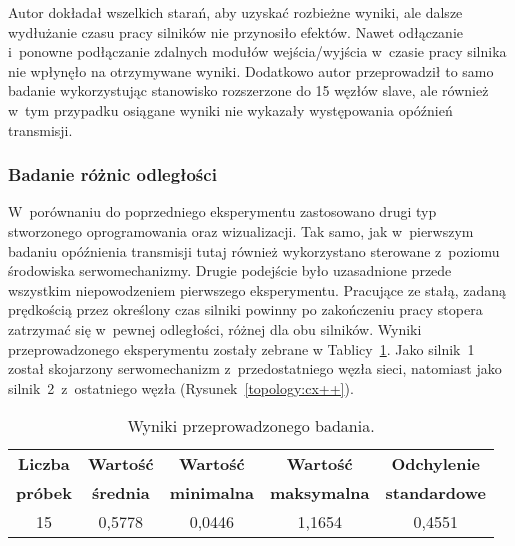 Autor dokładał wszelkich starań, aby uzyskać rozbieżne wyniki, ale dalsze wydłużanie czasu pracy silników nie przynosiło efektów. Nawet odłączanie i~ponowne podłączanie zdalnych modułów wejścia/wyjścia w~czasie pracy silnika nie wpłynęło na otrzymywane wyniki. Dodatkowo autor przeprowadził to samo badanie wykorzystując stanowisko rozszerzone do 15 węzłów slave, ale również w~tym przypadku osiągane wyniki nie wykazały występowania opóźnień transmisji.
\clearpage
\subsubsection{Badanie różnic odległości}
W~porównaniu do poprzedniego eksperymentu zastosowano drugi typ stworzonego oprogramowania oraz wizualizacji. Tak samo, jak w~pierwszym badaniu opóźnienia transmisji tutaj również wykorzystano sterowane z~poziomu środowiska serwomechanizmy. Drugie podejście było uzasadnione przede wszystkim niepowodzeniem pierwszego eksperymentu. Pracujące ze stałą, zadaną prędkością przez określony czas silniki powinny po zakończeniu pracy stopera zatrzymać się w~pewnej odległości, różnej dla obu silników. Wyniki przeprowadzonego eksperymentu zostały zebrane w Tablicy~\ref{badania:wyniki:servo_dist}. Jako silnik~1 został skojarzony serwomechanizm z~przedostatniego węzła sieci, natomiast jako silnik~2~z~ostatniego węzła (Rysunek~\ref{topology:cx++}).

\begin{table}[!htb]
\begin{center}
\begin{tabular}{| c | c | c | c | c |}\hline
\textbf{Liczba} & \textbf{Wartość} & \textbf{Wartość} & \textbf{Wartość} & \textbf{Odchylenie} \\
\textbf{próbek} & \textbf{średnia} & \textbf{minimalna} & \textbf{maksymalna} & \textbf{standardowe} \\\hline\hline
15 & 0,5778 & 0,0446 & 1,1654 & 0,4551\\\hline
\end{tabular}
\end{center}
\vspace*{-6mm}
  \caption{Wyniki przeprowadzonego badania.}
	\label{badania:wyniki:servo_dist}
\end{table}

